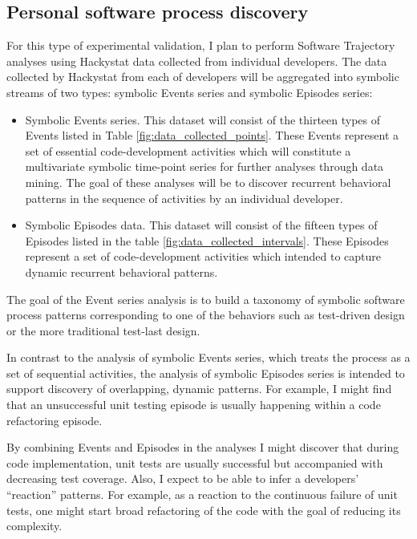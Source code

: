 \subsection{Personal software process discovery}
For this type of experimental validation, I plan to perform Software Trajectory analyses using Hackystat data collected from individual developers. The data collected by Hackystat from each of developers will be aggregated into symbolic streams of two types: symbolic Events series and symbolic Episodes series:
\begin{itemize}
	\item Symbolic Events series. This dataset will consist of the thirteen types of Events listed in Table \ref{fig:data_collected_points}. These Events represent a set of essential code-development activities which will constitute a multivariate symbolic time-point series for further analyses through data mining. The goal of these analyses will be to discover recurrent behavioral patterns in the sequence of activities by an individual developer. 
	\item Symbolic Episodes data. This dataset will consist of the fifteen types of Episodes listed in the table \ref{fig:data_collected_intervals}. These Episodes represent a set of code-development activities which intended to capture dynamic recurrent behavioral patterns.
\end{itemize}

The goal of the Event series analysis is to build a taxonomy of symbolic software process patterns corresponding to one of the behaviors such as test-driven design or the more traditional test-last design.

In contrast to the analysis of symbolic Events series, which treats the process as a set of sequential activities, the analysis of symbolic Episodes series is intended to support discovery of overlapping, dynamic patterns. For example, I might find that an unsuccessful unit testing episode is usually happening within a code refactoring episode. 

By combining Events and Episodes in the analyses I might discover that during code implementation, unit tests are usually successful but accompanied with decreasing test coverage. Also, I expect to be able to infer a developers' ``reaction'' patterns. For example, as a reaction to the continuous failure of unit tests, one might start broad refactoring of the code with the goal of reducing its complexity. 

